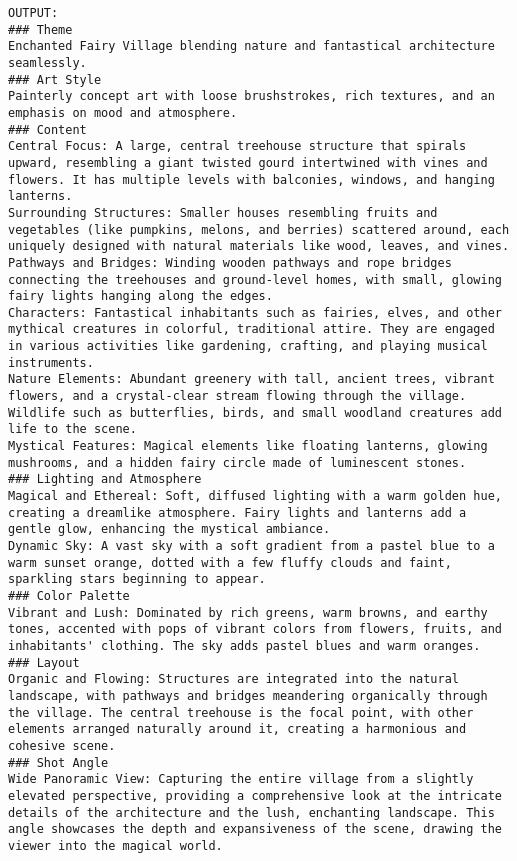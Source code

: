 \begin{lstlisting}
OUTPUT:
### Theme
Enchanted Fairy Village blending nature and fantastical architecture seamlessly.
### Art Style
Painterly concept art with loose brushstrokes, rich textures, and an emphasis on mood and atmosphere.
### Content
Central Focus: A large, central treehouse structure that spirals upward, resembling a giant twisted gourd intertwined with vines and flowers. It has multiple levels with balconies, windows, and hanging lanterns.
Surrounding Structures: Smaller houses resembling fruits and vegetables (like pumpkins, melons, and berries) scattered around, each uniquely designed with natural materials like wood, leaves, and vines.
Pathways and Bridges: Winding wooden pathways and rope bridges connecting the treehouses and ground-level homes, with small, glowing fairy lights hanging along the edges.
Characters: Fantastical inhabitants such as fairies, elves, and other mythical creatures in colorful, traditional attire. They are engaged in various activities like gardening, crafting, and playing musical instruments.
Nature Elements: Abundant greenery with tall, ancient trees, vibrant flowers, and a crystal-clear stream flowing through the village. Wildlife such as butterflies, birds, and small woodland creatures add life to the scene.
Mystical Features: Magical elements like floating lanterns, glowing mushrooms, and a hidden fairy circle made of luminescent stones.
### Lighting and Atmosphere
Magical and Ethereal: Soft, diffused lighting with a warm golden hue, creating a dreamlike atmosphere. Fairy lights and lanterns add a gentle glow, enhancing the mystical ambiance.
Dynamic Sky: A vast sky with a soft gradient from a pastel blue to a warm sunset orange, dotted with a few fluffy clouds and faint, sparkling stars beginning to appear.
### Color Palette
Vibrant and Lush: Dominated by rich greens, warm browns, and earthy tones, accented with pops of vibrant colors from flowers, fruits, and inhabitants' clothing. The sky adds pastel blues and warm oranges.
### Layout
Organic and Flowing: Structures are integrated into the natural landscape, with pathways and bridges meandering organically through the village. The central treehouse is the focal point, with other elements arranged naturally around it, creating a harmonious and cohesive scene.
### Shot Angle
Wide Panoramic View: Capturing the entire village from a slightly elevated perspective, providing a comprehensive look at the intricate details of the architecture and the lush, enchanting landscape. This angle showcases the depth and expansiveness of the scene, drawing the viewer into the magical world.
\end{lstlisting}



